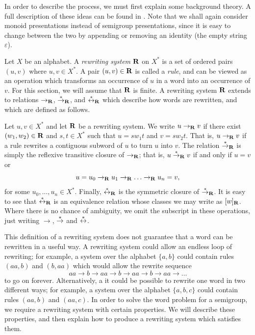 In order
to describe the process, we must first explain some background theory.  A full
description of these ideas can be found in \cite[Section 12.2]{cgt}.  Note that
we shall again consider monoid presentations instead of semigroup presentations,
since it is easy to change between the two by appending or removing an identity
(the empty string $\varepsilon$).

Let $X$ be an alphabet.  A \textit{rewriting system} $\mathbf{R}$ on $X^*$ is a
set of ordered pairs $(u,v)$ where $u, v \in X^*$.
A pair $(u,v) \in \mathbf{R}$ is called a \textit{rule}, and can be viewed as
an operation which transforms an occurrence of $u$ in a word into an occurrence
of $v$.
For this section, we will assume that $\mathbf{R}$ is finite.
A rewriting system $\mathbf{R}$ extends to relations
$\to_{\mathbf{R}}$, $\stackrel{*}{\to}_{\mathbf{R}}$, and $\stackrel{*}{\leftrightarrow}_{\mathbf{R}}$
which describe how words are rewritten, and which are defined as follows.

Let $u, v \in X^*$ and let $\mathbf{R}$ be a rewriting system.
We write $u \to_{\mathbf{R}} v$ if there exist $(w_1, w_2) \in \mathbf{R}$ and
$s, t \in X^*$ such that $u=sw_1t$ and $v=sw_2t$.
That is, $u \to_{\mathbf{R}} v$ if a rule rewrites a contiguous subword of $u$ to turn
$u$ into $v$.  The relation $\stackrel{*}{\to}_{\mathbf{R}}$ is simply the reflexive transitive
closure of $\to_{\mathbf{R}}$; that is, $u \stackrel{*}{\to}_{\mathbf{R}} v$ if and only if $u = v$ or
$$u = u_0 \to_{\mathbf{R}} u_1 \to_{\mathbf{R}} \ldots \to_{\mathbf{R}} u_n = v,$$
for some $u_0, \ldots, u_n \in X^*$.
Finally, $\stackrel{*}{\leftrightarrow}_{\mathbf{R}}$ is the symmetric closure of
$\stackrel{*}{\to}_{\mathbf{R}}$.  It is easy to see that $\stackrel{*}{\leftrightarrow}_{\mathbf{R}}$ is an equivalence
relation whose classes we may write as $[w]_{\mathbf{R}}$.
Where there is no chance of ambiguity, we omit the subscript in these
operations, just writing $\to$, $\stackrel{*}{\to}$ and $\stackrel{*}{\leftrightarrow}$.

This definition of a rewriting system does not guarantee that a word can be
rewritten in a useful way.  A rewriting system could allow an endless loop of
rewriting; for example, a system over the alphabet $\{a,b\}$ could contain rules
$(aa,b)$ and $(b,aa)$ which would allow the rewrite sequence
$$aa \to b \to aa \to b \to aa \to b \to aa \to \ldots$$
to go on forever.  Alternatively, a it could be possible to rewrite one word in
two different ways; for example, a system over the alphabet $\{a,b,c\}$ could
contain rules $(aa,b)$ and $(aa,c)$.
In order to solve the word problem for a semigroup, we require a
rewriting system with certain properties.  We will describe these properties,
and then explain how to produce a rewriting system which satisfies them.

